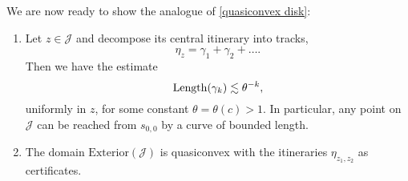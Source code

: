 We are now ready to show the analogue of \cref{quasiconvex disk}:
\begin{theorem} 
\begin{enumerate}[label=\normalfont(\roman*)]

\item Let $z\in\mathcal{J}$ and decompose its central itinerary into tracks, 
\begin{equation*}
\eta_z = \gamma _1 +\gamma_2 +\dots.
\end{equation*}
Then we have the estimate
\begin{equation*}
\operatorname{Length}(\gamma_{k})\lesssim\theta^{-k},
\end{equation*}
uniformly in
$z$, for some constant $\theta=\theta(c)>1$. In particular, any point on \(\mathcal{J}\) can be reached from $s_{0,0}$ by a curve of bounded length.

\item The domain $\mathrm{Exterior}(\mathcal{J})$ is quasiconvex with the itineraries $\eta_{z_1,z_2}$ as certificates.
	\end{enumerate}
\end{theorem}

